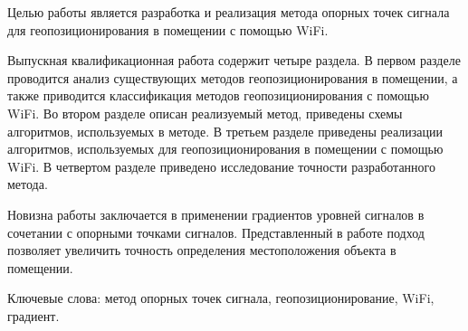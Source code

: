 \begin{essay}{}

    Целью работы является разработка и реализация метода опорных точек сигнала для геопозиционирования в помещении с помощью WiFi.

    Выпускная квалификационная работа содержит четыре раздела. В первом разделе проводится анализ существующих методов геопозиционирования в помещении, а также приводится классификация методов геопозиционирования с помощью WiFi. Во втором разделе описан реализуемый метод, приведены схемы алгоритмов, используемых в методе. В третьем разделе приведены реализации алгоритмов, используемых для геопозиционирования в помещении с помощью WiFi. В четвертом разделе приведено исследование точности разработанного метода.

    Новизна работы заключается в применении градиентов уровней сигналов в сочетании с опорными точками сигналов. Представленный в работе подход позволяет увеличить точность определения местоположения объекта в помещении.

    Ключевые слова: метод опорных точек сигнала, геопозиционирование, WiFi, градиент.

\end{essay}